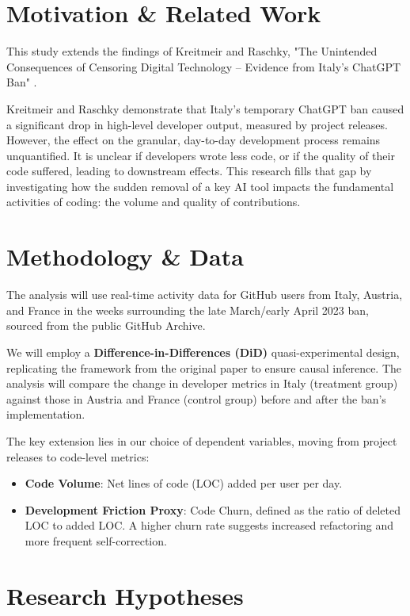 \section*{Motivation \& Related Work}

This study extends the findings of Kreitmeir and Raschky, "The Unintended Consequences of Censoring Digital Technology – Evidence from Italy’s ChatGPT Ban" \cite{Kreitmeir2023}.

Kreitmeir and Raschky demonstrate that Italy's temporary ChatGPT ban caused a significant drop in high-level developer output, measured by project releases. However, the effect on the granular, day-to-day development process remains unquantified. It is unclear if developers wrote less code, or if the quality of their code suffered, leading to downstream effects. This research fills that gap by investigating how the sudden removal of a key AI tool impacts the fundamental activities of coding: the volume and quality of contributions.


\section*{Methodology \& Data}

The analysis will use real-time activity data for GitHub users from Italy, Austria, and France in the weeks surrounding the late March/early April 2023 ban, sourced from the public GitHub Archive.

We will employ a \textbf{Difference-in-Differences (DiD)} quasi-experimental design, replicating the framework from the original paper to ensure causal inference. The analysis will compare the change in developer metrics in Italy (treatment group) against those in Austria and France (control group) before and after the ban's implementation.

The key extension lies in our choice of dependent variables, moving from project releases to code-level metrics:

\begin{itemize}
  \item \textbf{Code Volume}: Net lines of code (LOC) added per user per day.
  \item \textbf{Development Friction Proxy}: Code Churn, defined as the ratio of deleted LOC to added LOC. A higher churn rate suggests increased refactoring and more frequent self-correction.
\end{itemize}


\section*{Research Hypotheses}

